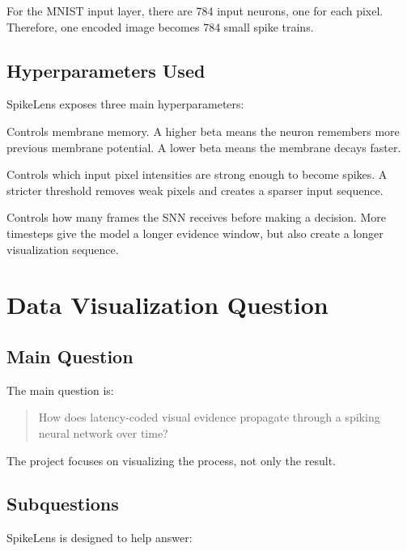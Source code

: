 \documentclass[11pt,a4paper]{article}
\newcommand{\projecttitle}{SpikeLens}
\begin{document}
For the MNIST input layer, there are 784 input neurons, one for each pixel. Therefore, one encoded image becomes 784 small spike trains.

\subsection{Hyperparameters Used}

\projecttitle{} exposes three main hyperparameters:

\begin{description}[leftmargin=2.7cm,style=nextline]
    \item[Beta] Controls membrane memory. A higher beta means the neuron remembers more previous membrane potential. A lower beta means the membrane decays faster.
    \item[Latency threshold] Controls which input pixel intensities are strong enough to become spikes. A stricter threshold removes weak pixels and creates a sparser input sequence.
    \item[Inference timesteps] Controls how many frames the SNN receives before making a decision. More timesteps give the model a longer evidence window, but also create a longer visualization sequence.
\end{description}

\section{Data Visualization Question}

\subsection{Main Question}

The main question is:

\begin{quote}
How does latency-coded visual evidence propagate through a spiking neural network over time?
\end{quote}

The project focuses on visualizing the process, not only the result.

\subsection{Subquestions}

\projecttitle{} is designed to help answer:
\end{document}
